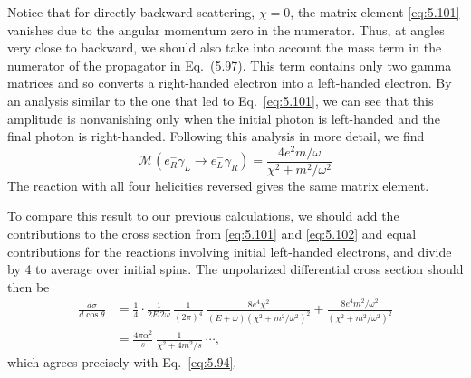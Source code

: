 Notice that for directly backward scattering, $\chi = 0$, the matrix element
\eqref{eq:5.101} vanishes due to the angular momentum zero in the numerator.
Thus, at angles very close to backward, we should also take into account the
mass term in the numerator of the propagator in Eq.~(5.97).  This term
contains only two gamma matrices and so converts a right-handed electron into
a left-handed electron.  By an analysis similar to the one that led to
Eq.~\eqref{eq:5.101}, we can see that this amplitude is nonvanishing only
when the initial photon is left-handed and the final photon is right-handed.
Following this analysis in more detail, we find
\begin{equation}
  \mathcal{M}(e^{-}_R\gamma_L \to e^{-}_L\gamma_R) = \frac{4e^2 m/\omega}
    {\chi^2 + m^2/\omega^2}
  \label{eq:5.102}
\end{equation}
The reaction with all four helicities reversed gives the same matrix element.

To compare this result to our previous calculations, we should add the
contributions to the cross section from \eqref{eq:5.101} and \eqref{eq:5.102}
and equal contributions for the reactions involving initial left-handed
electrons, and divide by 4 to average over initial spins.  The unpolarized
differential cross section should then be
\begin{equation}
  \begin{aligned}
    \frac{d\sigma}{d\cos\theta} &= \frac{1}{4}\cdot\frac{1}{2E\,2\omega}\,
      \frac{1}{(2\pi)^4}\ \frac{8e^4\chi^2}{(E+\omega)(\chi^2+m^2/\omega^2)^2}
      + \frac{8e^4 m^2/\omega^2}{(\chi^2+m^2/\omega^2)^2}\\
    &= \frac{4\pi\alpha^2}{s}\ \frac{1}{\chi^2+4m^2/s}\ \cdots ,
  \end{aligned}
  \label{eq:5.103}
\end{equation}
which agrees precisely with Eq.~\eqref{eq:5.94}.

